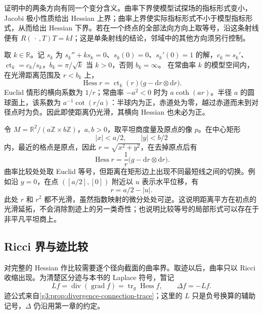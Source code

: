 证明中的两条方向有同一个变分含义。曲率下界使模型试探场的指标形式变小，Jacobi 极小性质给出 Hessian 上界；曲率上界使实际指标形式不小于模型指标形式，从而给出 Hessian 下界。若在一个终点的全部法向方向上取等号，沿这条射线便有 \(R(\,\cdot\,,T)T=kI\)；这是单条射线的结论，邻域中的其他方向须另行控制。

\begin{example}\label{g3:exm:model-distance-hessian}
	取 \(k\in\mathbb R\)。记 \(s_k\) 为 \(s_k''+ks_k=0\)、\(s_k(0)=0\)、\(s_k'(0)=1\) 的解，\(c_k=s_k'\)、\(\operatorname{ct}_k=c_k/s_k\)，\(b_k=\pi/\sqrt k\) 当 \(k>0\)，否则 \(b_k=\infty\)。
	在常曲率 \(k\) 的模型空间内，在光滑距离范围及 \(r<b_k\) 上，
	\[
		\operatorname{Hess}r
		=\operatorname{ct}_k(r)
		\bigl(g-\mathrm dr\otimes\mathrm dr\bigr).
	\]
	Euclid 情形的横向系数为 \(1/r\)；常曲率 \(-a^2<0\) 时为 \(a\coth(ar)\)。半径 \(a\) 的圆球面上，该系数为 \(a^{-1}\cot(r/a)\)：半球内为正，赤道处为零，越过赤道而未到对径点时为负。因此即使距离仍光滑，其横向 Hessian 也未必为正。
\end{example}

\begin{example}\label{g3:exm:flat-quotient-distance-hessian}
	令 \(M=\mathbb R^2/(a\mathbb Z\times b\mathbb Z)\)，\(a,b>0\)，取平坦商度量及原点的像 \(p\)。在中心矩形
	\[
		|x|<a/2,\qquad |y|<b/2
	\]
	内，最近的格点是原点，因此 \(r=\sqrt{x^2+y^2}\)，在去掉原点后有
	\[
		\operatorname{Hess}r
		=\frac1r\bigl(g-\mathrm dr\otimes\mathrm dr\bigr).
	\]
	曲率比较处处取 Euclid 等号，但距离在矩形边上出现不同最短线之间的切换。例如沿 \(y=0\)，在点 \(([a/2],[0])\) 附近以 \(u\) 表示水平位移，有
	\[
		r=a/2-|u|.
	\]
	此处 \(r\) 和 \(r^2\) 都不光滑，虽然指数映射的微分处处可逆。这说明距离平方在初点的光滑延拓，不会消除割迹上的另一类奇性；也说明比较等号的局部形式可以存在于非平凡平坦商上。
\end{example}

\subsection{Ricci 界与迹比较}
\label{g3:subsec:0703:03}

对完整的 Hessian 作比较需要逐个径向截面的曲率界。取迹以后，曲率只以 Ricci 收缩出现。为清楚区分迹与本书的 Laplace 符号，暂记
\[
	Lf=\operatorname{div}(\operatorname{grad}f)
	=\operatorname{tr}_g\operatorname{Hess}f,
	\qquad \Delta f=-Lf.
\]
迹公式来自\cref{g3:prop:divergence-connection-trace}；这里的 \(L\) 只是负号换算的辅助记号，\(\Delta\) 仍沿用第一章的约定。

